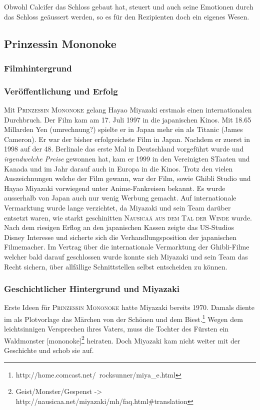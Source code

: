 Obwohl Calcifer das Schloss gebaut hat, steuert und auch seine Emotionen durch das Schloss geäussert werden, so es für den Rezipienten doch ein eigenes Wesen.

\subsection{Prinzessin Mononoke}
\subsubsection{Filmhintergrund}
\subsubsection*{Veröffentlichung und Erfolg}
Mit \textsc{Prinzessin Mononoke} gelang Hayao Miyazaki erstmals einen internationalen Durchbruch. Der Film kam am 17. Juli 1997 in die japanischen Kinos. Mit 18.65 Millarden Yen (umrechnung?) spielte er in Japan mehr ein als Titanic (James Cameron). Er war der bisher erfolgreichste Film in Japan. Nachdem er zuerst in 1998 auf der 48. Berlinale das erste Mal in Deutschland vorgeführt wurde und \emph{irgendwelche Preise} gewonnen hat, kam er 1999 in den Vereinigten STaaten und Kanada und im Jahr darauf auch in Europa in die Kinos. Trotz den vielen Auszeichnungen welche der Film gewann, war der Film, sowie Ghibli Studio und Hayao Miyazaki vorwiegend unter Anime-Fankreisen bekannt. Es wurde ausserhalb von Japan auch nur wenig Werbung gemacht. Auf internationale Vermarktung wurde lange verzichtet, da Miyazaki und sein Team darüber entsetzt waren, wie starkt geschinitten \textsc{Nausicaä aus dem Tal der Winde} wurde. Nach dem riesigen Erflog an den japanischen Kassen zeigte das US-Studios Disney Interesse und sicherte sich die Verhandlungsposition der japanischen Filmemacher. Im Vertrag über die internationale Vermarktung der Ghibli-Filme welcher bald darauf geschlossen wurde konnte sich Miyazaki und sein Team das Recht sichern, über allfällige Schnittstellen selbst entscheiden zu können. 

\subsubsection*{Geschichtlicher Hintergrund und Miyazaki}
Erste Ideen für \textsc{Prinzessin Mononoke} hatte Miyazaki bereits 1970. Damals diente im als Plotvorlage das Märchen von der Schönen und dem Biest.\footnote{http://home.comcast.net/~rocksunner/miya\_e.html} Wegen dem leichtsinnigen Versprechen ihres Vaters, muss die Tochter des Fürsten ein Waldmonster [mononoke]\footnote{Geist/Monster/Gespenst -> http://nausicaa.net/miyazaki/mh/faq.html\#translation} heiraten. Doch Miyazaki kam nicht weiter mit der Geschichte und schob sie auf. 

